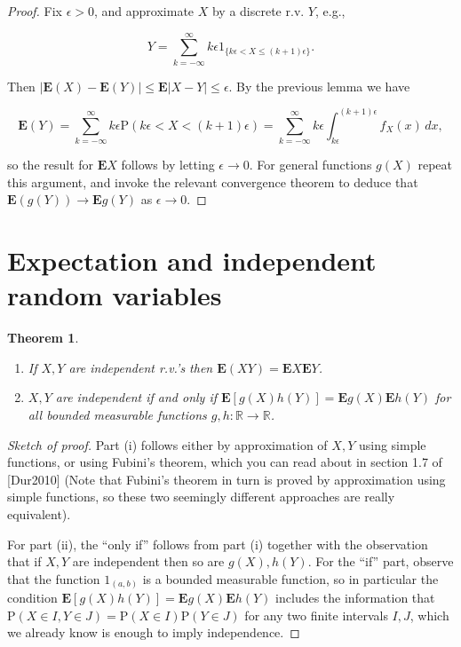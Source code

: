 \documentclass[11pt]{report}
\newcommand{\R}{\mathbb{R}}
\theoremstyle{plain}
\newtheorem{thm}{Theorem}[chapter]
\theoremstyle{definition}
\begin{document}
\begin{proof}
Fix $\epsilon>0$, and approximate $X$ by a discrete
r.v. $Y$, e.g.,

\[
Y = \sum_{k=-\infty}^\infty k\epsilon 1_{\{k\epsilon < X \le (k+1)\epsilon\}}.
\]

Then
$|\mathbf{E}(X)-\mathbf{E}(Y)| \le \mathbf{E}|X-Y|
\le \epsilon$.
By the previous lemma we have

\[
\mathbf{E}(Y)  = \sum_{k=-\infty}^\infty k\epsilon \mathrm{P}(k\epsilon<X<(k+1)\epsilon) =\sum_{k=-\infty}^\infty k\epsilon \int_{k\epsilon}^{(k+1)\epsilon} f_X(x)\,dx,
\]

so the result for $\mathbf{E} X$ follows by letting
$\epsilon\to 0$. For general functions $g(X)$ repeat
this argument, and invoke the relevant convergence
theorem to deduce that
$\mathbf{E}(g(Y))\to \mathbf{E} g(Y)$ as
$\epsilon\to 0$.
\end{proof}

\section{Expectation and independent random variables}

\begin{thm}

\begin{enumerate}[label=(\roman*)]
\item If $X,Y$ are independent r.v.'s then
$\mathbf{E}(X Y) = \mathbf{E} X \mathbf{E} Y$.

\item $X,Y$ are independent if and only if
$\mathbf{E}[g(X)h(Y)] = \mathbf{E} g(X) \mathbf{E}
h(Y)$
for all bounded measurable functions $g,h:\R\to\R$.
\end{enumerate}

\end{thm}

\begin{proof}[Sketch of proof]
Part (i) follows either by approximation of $X,Y$
using simple functions, or using Fubini's theorem,
which you can read about in section 1.7 of [Dur2010]
(Note that Fubini's theorem in turn is proved by
approximation using simple functions, so these two
seemingly different approaches are really equivalent).

For part (ii), the ``only if'' follows from part (i)
together with the observation that if $X,Y$ are
independent then so are $g(X), h(Y)$. For the ``if''
part, observe that the function $1_{(a,b)}$ is a
bounded measurable function, so in particular the
condition
$\mathbf{E}[g(X)h(Y)]=\mathbf{E} g(X) \mathbf{E}
h(Y)$
includes the information that
$\mathrm{P}(X\in I, Y\in J)=\mathrm{P}(X \in I)
\mathrm{P}(Y\in J)$
for any two finite intervals $I,J$, which we already
know is enough to imply independence.
\end{proof}
\end{document}
